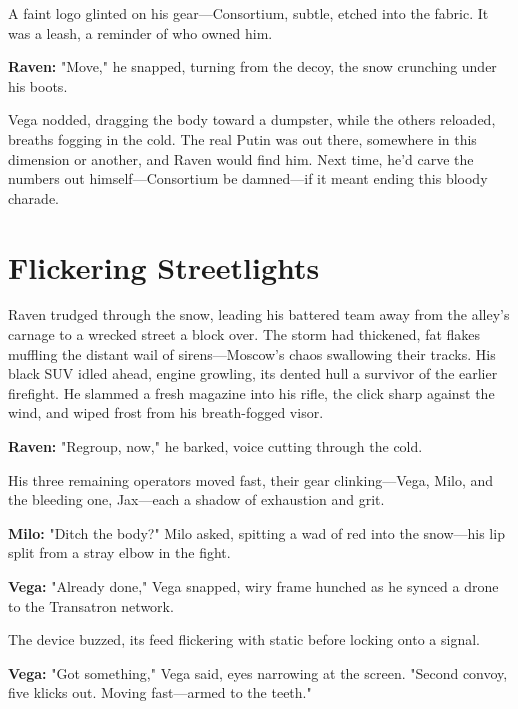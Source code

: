\documentclass[12pt]{book}
\begin{document}
A faint logo glinted on his gear—Consortium, subtle, etched into the fabric. It was a leash, a reminder of who owned him.

\vspace{0.5em}
\textbf{Raven:} "Move," he snapped, turning from the decoy, the snow crunching under his boots.

Vega nodded, dragging the body toward a dumpster, while the others reloaded, breaths fogging in the cold. The real Putin was out there, somewhere in this dimension or another, and Raven would find him. Next time, he’d carve the numbers out himself—Consortium be damned—if it meant ending this bloody charade.

\vspace{1em}

\section{Flickering Streetlights}

Raven trudged through the snow, leading his battered team away from the alley’s carnage to a wrecked street a block over. The storm had thickened, fat flakes muffling the distant wail of sirens—Moscow’s chaos swallowing their tracks. His black SUV idled ahead, engine growling, its dented hull a survivor of the earlier firefight. He slammed a fresh magazine into his rifle, the click sharp against the wind, and wiped frost from his breath-fogged visor.

\vspace{0.5em}
\textbf{Raven:} "Regroup, now," he barked, voice cutting through the cold.

His three remaining operators moved fast, their gear clinking—Vega, Milo, and the bleeding one, Jax—each a shadow of exhaustion and grit.

\vspace{0.5em}
\textbf{Milo:} "Ditch the body?" Milo asked, spitting a wad of red into the snow—his lip split from a stray elbow in the fight.

\vspace{0.5em}
\textbf{Vega:} "Already done," Vega snapped, wiry frame hunched as he synced a drone to the Transatron network.

The device buzzed, its feed flickering with static before locking onto a signal.

\vspace{0.5em}
\textbf{Vega:} "Got something," Vega said, eyes narrowing at the screen. "Second convoy, five klicks out. Moving fast—armed to the teeth."
\end{document}
